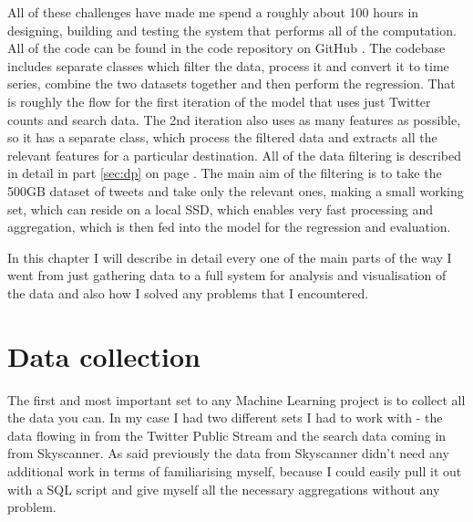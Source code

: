 \documentclass[minf,frontabs,twoside,singlespacing,parskip]{infthesis}
\begin{document}
All of these challenges have made me spend a roughly about 100 hours in designing, building and testing the system that performs all of the computation. All of the code can be found in the code repository on GitHub \cite{code}. The codebase includes separate classes which filter the data, process it and convert it to time series, combine the two datasets together and then perform the regression. That is roughly the flow for the first iteration of the model that uses just Twitter counts and search data. The 2nd iteration also uses as many features as possible, so it has a separate class, which process the filtered data and extracts all the relevant features for a particular destination. All of the data filtering is described in detail in part  \ref{sec:dp} on page \pageref{sec:dp}. The main aim of the filtering is to take the 500GB dataset of tweets and take only the relevant ones, making a small working set, which can reside on a local SSD, which enables very fast processing and aggregation, which is then fed into the model for the regression and evaluation. 


In this chapter I will describe in detail every one of the main parts of the way I went from just gathering data to a full system for analysis and visualisation of the data and also how I solved any problems that I encountered.


\section{Data collection}
\label{sec:dc}


The first and most important set to any Machine Learning project is to collect all the data you can. In my case I had two different sets I had to work with - the data flowing in from the Twitter Public Stream and the search data coming in from Skyscanner. As said previously the data from Skyscanner didn't need any additional work in terms of familiarising myself, because I could easily pull it out with a SQL script and give myself all the necessary aggregations without any problem. 
\end{document}
